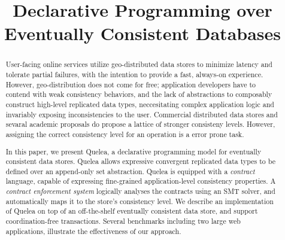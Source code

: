 \documentclass[pldi]{sigplanconf}
\begin{document}
%
%

\title{Declarative Programming over Eventually Consistent Databases }

\maketitle
\begin{abstract}
User-facing online services utilize geo-distributed data stores to minimize
latency and tolerate partial failures, with the intention to provide a fast,
always-on experience. However, geo-distribution does not come for free;
application developers have to contend with weak consistency behaviors, and the
lack of abstractions to composably construct high-level replicated data types,
neccesitating complex application logic and invariably exposing inconsistencies
to the user. Commercial distributed data stores and sevaral academic proposals
do propose a lattice of stronger consisteny levels. However, assigning the
correct consistency level for an operation is a error prone task.

In this paper, we present Quelea, a declarative programming model for
eventually consistent data stores. Quelea allows expressive convergent
replicated data types to be defined over an append-only set abstraction. Quelea
is equipped with a \emph{contract} language, capable of expressing fine-grained
application-level consistency properties. A \emph{contract enforcement system}
logically analyses the contracts using an SMT solver, and automatically maps it
to the store's consistency level. We describe an implementation of Quelea on
top of an off-the-shelf eventually consistent data store, and support
coordination-free transactions. Several benchmarks including two large web
applications, illustrate the effectiveness of our approach.
\end{abstract}


\end{document}
